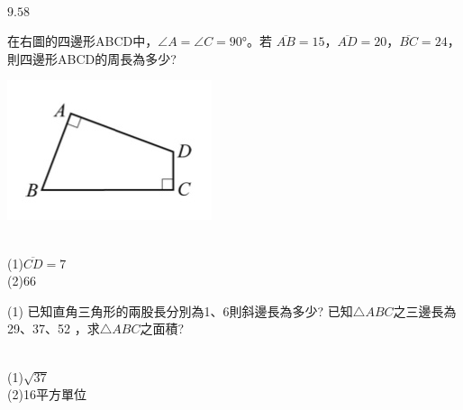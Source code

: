 \documentclass
[answers]
{exam}
\theoremstyle{definition}
\newif\ifyr\yrfalse %
\newcommand{\yr}[1]{\ifyr\relax\else #1\fi}
\newif\ifsho\shofalse %
\newcommand{\sho}[1]{\ifsho\relax\else\rightline{【#1】}\fi}
\begin{document}
\begin{questions}
\begin{solution}~\\
	$9.58$
\end{solution}

\begin{minipage}[t]{0.7\linewidth}

\question
在右圖的四邊形ABCD中，$\angle A=\angle C=90°$。若 $\overline{AB} =15$，$\overline{AD} =20$，$\overline{BC}=24$，則四邊形ABCD的周長為多少?

\end{minipage}
\hfill
\begin{minipage}[t]{0.3\linewidth}
\vspace*{-0.3cm}
\includegraphics[scale=0.5]{./figure/A_5.jpg}
\raggedleft %
\end{minipage}

\begin{solution}~\\
	(1)$\overline{CD}=7$\\
	(2)$66$
\end{solution}

\question
\begin{tasks}(1)
	\task 已知直角三角形的兩股長分別為1、6則斜邊長為多少?
	\task 已知$\triangle ABC$之三邊長為29、37、52 ，求$\triangle ABC$之面積?
\end{tasks}
\begin{solution}~\\
	(1)$\sqrt{37}$\\
	(2)16平方單位
\end{solution}





\end{questions}
\end{document}
